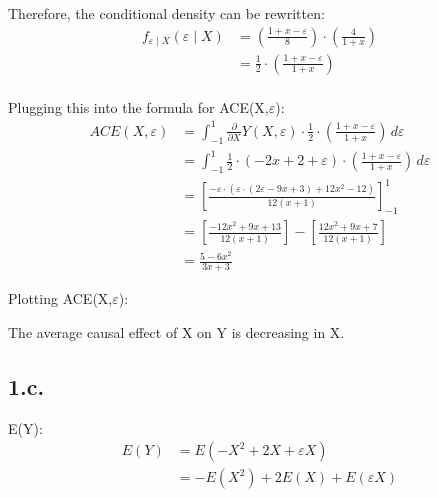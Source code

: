 \documentclass{article}
\begin{document}
Therefore, the conditional density can be rewritten:
\begin{align*}
    f_{\varepsilon \mid X}(\varepsilon \mid X)
    &= \left(\frac{1+x-\varepsilon}{8}\right)\cdot\left(\frac{4}{1+x}\right)\\
    &= \frac{1}{2} \cdot \left(\frac{1+x-\varepsilon}{1+x}\right)\\
\end{align*}

Plugging this into the formula for ACE(X,$\varepsilon$):
\begin{align*}
    ACE(X, \varepsilon)
    &= \int_{-1}^{1} \frac{\partial}{\partial X}Y(X,\varepsilon)\cdot \frac{1}{2} \cdot \left(\frac{1+x-\varepsilon}{1+x}\right) \,d\varepsilon \\
    &= \int_{-1}^{1} \frac{1}{2}\cdot (-2x + 2 + \varepsilon)\cdot 
    \left(\frac{1+x-\varepsilon}{1+x}\right) \,d\varepsilon \\
    &= \left[\frac{-\varepsilon\cdot\left(\varepsilon\cdot\left(2\varepsilon-9x+3\right)+12x^2-12\right)}{12\left(x+1\right)}\right]_{-1}^{1} \\
    &= \left[\frac{-12x^2 + 9x + 13}{12(x+1)}\right]
    - \left[\frac{12x^2 + 9x + 7}{12(x+1)}\right] \\
    &= \frac{5-6x^2}{3x+3}
\end{align*}

Plotting ACE(X,$\varepsilon$):

\begin{figure}[!h]
\centering
{}
\end{figure}

The average causal effect of X on Y is decreasing in X.

\subsection*{1.c.}
E(Y):
\begin{align*}
    E(Y)
    &= E(-X^2 + 2X + \varepsilon X)\\
    &= -E(X^2) + 2E(X) + E(\varepsilon X)\\
\end{align*}
\end{document}
